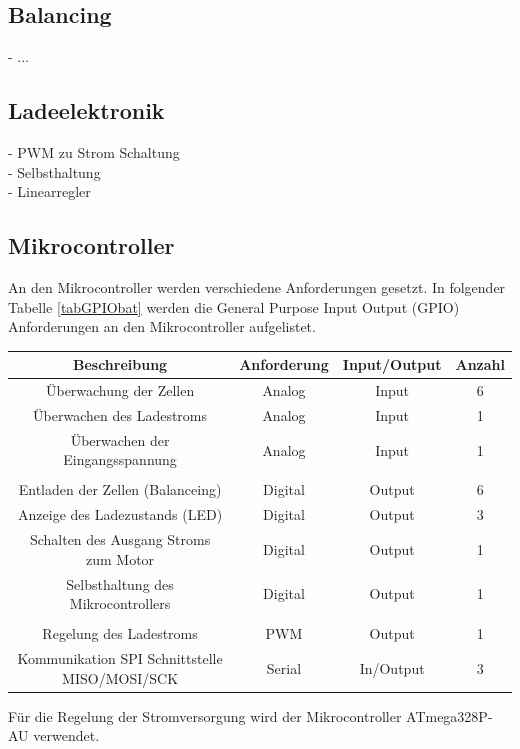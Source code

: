 \subsection*{Balancing}
- ...
\subsection*{Ladeelektronik}
-	PWM zu Strom Schaltung\\
-	Selbsthaltung\\
-	Linearregler

\subsection*{Mikrocontroller}
An den Mikrocontroller werden verschiedene Anforderungen gesetzt.
In folgender Tabelle \ref{tabGPIObat} werden die General Purpose Input Output (GPIO) Anforderungen an den Mikrocontroller aufgelistet.
\begin{center}
	\begin{tabular}{|c|c|c|c|}
		\hline 
		Beschreibung & Anforderung & Input/Output & Anzahl \\ 
		\hline 
		Überwachung der Zellen & Analog & Input & 6 \\ 
		\hline 
		Überwachen des Ladestroms &	Analog & Input & 1 \\ 
		\hline 
		Überwachen der Eingangsspannung & Analog & Input & 1 \\ 
		\hline 
		&  &  &  \\ 
		\hline 
		Entladen der Zellen (Balanceing) & Digital  & Output & 6 \\ 
		\hline 
		Anzeige des Ladezustands (LED) & Digital & Output & 3 \\ 
		\hline 
		Schalten des Ausgang Stroms zum Motor & Digital & Output & 1 \\ 
		\hline 
		Selbsthaltung des Mikrocontrollers & Digital & Output & 1 \\ 
		\hline 
		&  &  &  \\ 
		\hline 
		Regelung des Ladestroms & PWM & Output & 1 \\ 
		\hline 
		Kommunikation SPI Schnittstelle MISO/MOSI/SCK & Serial & In/Output & 3 \\ 
		\hline 
	\end{tabular} 
	\label{tabGPIObat}
\end{center}
Für die Regelung der Stromversorgung wird der Mikrocontroller ATmega328P-AU verwendet.
